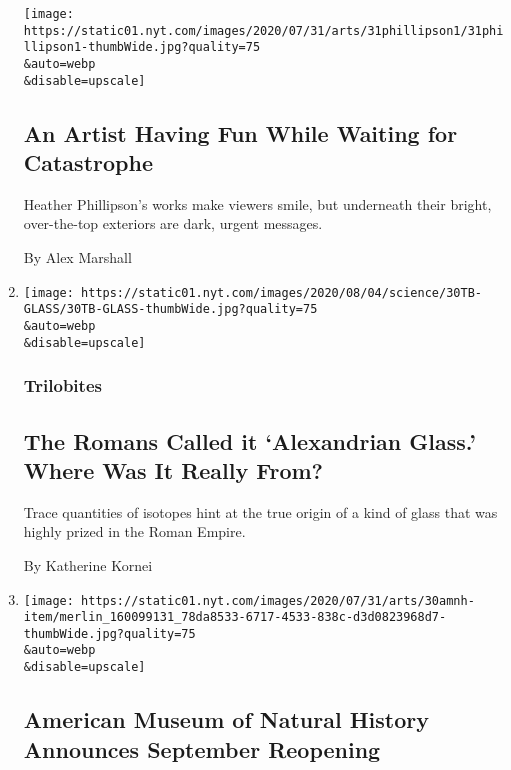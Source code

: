 \begin{enumerate}
  \texttt{[image: https://static01.nyt.com/images/2020/07/31/arts/31phillipson1/31phillipson1-thumbWide.jpg?quality=75\\\&auto=webp\\\&disable=upscale]}

  \hypertarget{an-artist-having-fun-while-waiting-for-catastrophe}{%
  \subsection{An Artist Having Fun While Waiting for
  Catastrophe}\label{an-artist-having-fun-while-waiting-for-catastrophe}}

  Heather Phillipson's works make viewers smile, but underneath their
  bright, over-the-top exteriors are dark, urgent messages.

  By Alex Marshall
\item
  \href{/2020/07/31/science/alexandrian-glass-rome.html}{}

  \texttt{[image: https://static01.nyt.com/images/2020/08/04/science/30TB-GLASS/30TB-GLASS-thumbWide.jpg?quality=75\\\&auto=webp\\\&disable=upscale]}

  \hypertarget{trilobites}{%
  \subsubsection{Trilobites}\label{trilobites}}

  \hypertarget{the-romans-called-it-alexandrian-glass-where-was-it-really-from}{%
  \subsection{The Romans Called it `Alexandrian Glass.' Where Was It
  Really
  From?}\label{the-romans-called-it-alexandrian-glass-where-was-it-really-from}}

  Trace quantities of isotopes hint at the true origin of a kind of
  glass that was highly prized in the Roman Empire.

  By Katherine Kornei
\item
  \href{/2020/07/30/arts/design/american-museum-of-natural-history-reopen-covid.html}{}

  \texttt{[image: https://static01.nyt.com/images/2020/07/31/arts/30amnh-item/merlin\_160099131\_78da8533-6717-4533-838c-d3d0823968d7-thumbWide.jpg?quality=75\\\&auto=webp\\\&disable=upscale]}

  \hypertarget{american-museum-of-natural-history-announces-september-reopening}{%
  \subsection{American Museum of Natural History Announces September
  Reopening}\label{american-museum-of-natural-history-announces-september-reopening}}


\end{enumerate}
